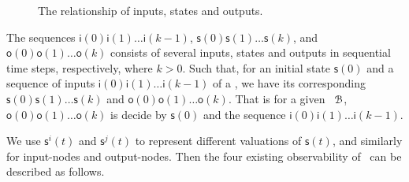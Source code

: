  \begin{figure}[!t]
      \centering
      
      \caption{The relationship of inputs, states and outputs.}
      \label{fig:10}
  \end{figure}
   The sequences $\mathsf{i}(0)\mathsf{i}(1)\ldots\mathsf{i}(k-1)$,  $\mathsf{s}(0)\mathsf{s}(1)\ldots\mathsf{s}(k)$, and $\mathsf{o}(0)\mathsf{o}(1)\ldots\mathsf{o}(k)$ 
 consists of several inputs, states and outputs in sequential time steps,  respectively, where $k>0$. 
 Such that, for an initial state $\mathsf{s}(0)$ and a  sequence of inputs $\mathsf{i}(0)\mathsf{i}(1)\ldots\mathsf{i}(k-1)$ of a \BCN, we have its corresponding 
$\mathsf{s}(0)\mathsf{s}(1)\ldots\mathsf{s}(k)$ and $\mathsf{o}(0)\mathsf{o}(1)\ldots\mathsf{o}(k)$.  
That is for a given  \BCN\  ${\mathcal{B}}$,  $\mathsf{o}(0)\mathsf{o}(1)\ldots\mathsf{o}(k)$ is decide by
$\mathsf{s}(0)$ and the sequence $\mathsf{i}(0)\mathsf{i}(1)\ldots\mathsf{i}(k-1)$. 
 
We use $\mathsf{s}^{i}(t)$ and $\mathsf{s}^{j}(t)$ to represent different valuations of $\mathsf{s}(t)$, and similarly for input-nodes and output-nodes. Then the four existing observability of \BCNs\ can be described as follows. 

